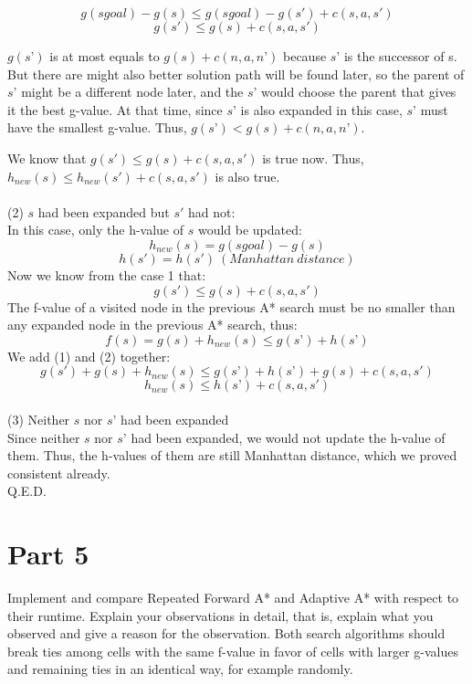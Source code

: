 \documentclass[11pt]{report}
\begin{document}
 $$g(sgoal) - g(s) \leq g(sgoal) - g(s') + c(s,a,s')  $$
 $$g(s')  \leq g(s) + c(s,a,s')  $$

$g(s’)$ is at most equals to $g(s) + c(n,a,n’)$ because $s’$ is the successor of s. But there are might also better solution path will be found later, so the parent of $s’$ might be a different node later, and the $s’$ would choose the parent that gives it the best g-value. At that time, since $s’$ is also expanded in this case, $s’$ must have the smallest g-value. Thus, $g(s’) < g(s) + c(n,a,n’)$.

We know that  $g(s')  \leq g(s) + c(s,a,s')  $ is true now. Thus, $h_{new}(s) \leq h_{new}(s') + c(s,a,s')  $ is also true.\\
\\

(2) $s$ had been expanded but $s'$ had not:\\

In this case, only the  h-value of $s$ would be updated:
$$h_{new}(s ) = g(sgoal) - g(s)$$
$$h(s') = h(s') \ (Manhattan\ distance)$$
Now we know from the case 1 that: 
\begin{equation} \label{eq:1}
g(s')  \leq g(s) + c(s,a,s')
\end{equation}
The f-value of a visited node in the previous A* search must be no smaller than any expanded node in the previous A* search, thus:
\begin{equation} \label{eq:2}
f(s) = g(s)+ h_{new}(s) \leq g(s’) + h(s’)
\end{equation}
We add (1) and (2) together:
$$g(s') + g(s)+ h_{new}(s) \leq g(s’) + h(s’) +g(s) + c(s,a,s')$$
$$h_{new}(s) \leq h(s’)  + c(s,a,s')$$\\


(3) Neither $s$ nor $s’$ had been expanded\\

Since neither $s$ nor $s’$ had been expanded, we would not update the h-value of them. Thus, the h-values of them are still Manhattan distance, which we proved consistent already.\\

\hspace{10mm} Q.E.D.\\

\newpage

\section*{Part 5}
Implement and compare Repeated Forward A* and Adaptive A* with respect to their runtime. Explain your observations in detail, that is, explain what you observed and give a reason for the observation. Both search algorithms should break ties among cells with the same f-value in favor of cells with larger g-values and remaining ties in an identical way, for example randomly.\\
\end{document}

